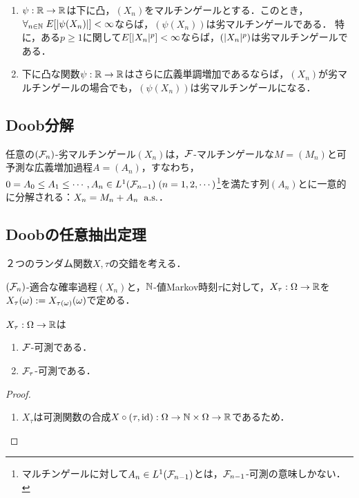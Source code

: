 \documentclass[uplatex,dvipdfmx]{jsreport}
\begin{document}
\begin{lemma}[劣マルチンゲール性の保存]\mbox{}
    \begin{enumerate}
        \item $\psi:\mathbb{R}\to\mathbb{R}$は下に凸，$(X_n)$をマルチンゲールとする．このとき，$\forall_{n\in\mathbb{N}}\;E[\lvert\psi(X_n)\rvert]<\infty$ならば，$(\psi(X_n))$は劣マルチンゲールである．
        特に，ある$p\ge1$に関して$E[\lvert X_n\rvert^p]<\infty$ならば，$(\lvert X_n\rvert^p)$は劣マルチンゲールである．
        \item 下に凸な関数$\psi:\mathbb{R}\to\mathbb{R}$はさらに広義単調増加であるならば，$(X_n)$が劣マルチンゲールの場合でも，$(\psi(X_n))$は劣マルチンゲールになる．
    \end{enumerate}
\end{lemma}

\subsection{Doob分解}

\begin{theorem}
    任意の$(\mathcal{F}_n)$-劣マルチンゲール$(X_n)$は，$\mathcal{F}$-マルチンゲールな$M=(M_n)$と可予測な広義増加過程$A=(A_n)$，すなわち，$0=A_0\le A_1\le\cdots,A_n\in L^1(\mathcal{F}_{n-1})\;(n=1,2,\cdots)$\footnote{マルチンゲールに対して$A_n\in L^1(\mathcal{F}_{n-1})$とは，$\mathcal{F}_{n-1}$-可測の意味しかない．}を満たす列$(A_n)$とに一意的に分解される：$X_n=M_n+A_n\;\;\mathrm{a.s.}$．
\end{theorem}

\subsection{Doobの任意抽出定理}

\begin{tcolorbox}[colframe=ForestGreen, colback=ForestGreen!10!white,breakable,colbacktitle=ForestGreen!40!white,coltitle=black,fonttitle=\bfseries\sffamily,
title=]
    ２つのランダム関数$X,\tau$の交錯を考える．
\end{tcolorbox}

\begin{definition}
    $(\mathcal{F}_n)$-適合な確率過程$(X_n)$と，$\mathbb{N}$-値Markov時刻$\tau$に対して，$X_\tau:\Omega\to\mathbb{R}$を$X_\tau(\omega):=X_{\tau(\omega)}(\omega)$で定める．
\end{definition}

\begin{lemma}
    $X_\tau:\Omega\to\mathbb{R}$は
    \begin{enumerate}
        \item $\mathcal{F}$-可測である．
        \item $\mathcal{F}_\tau$-可測である．
    \end{enumerate}
\end{lemma}
\begin{proof}\mbox{}
    \begin{enumerate}
        \item $X_\tau$は可測関数の合成$X\circ (\tau,\mathrm{id}):\Omega\to\mathbb{N}\times\Omega\to\mathbb{R}$であるため．
    \end{enumerate}
\end{proof}
\end{document}
